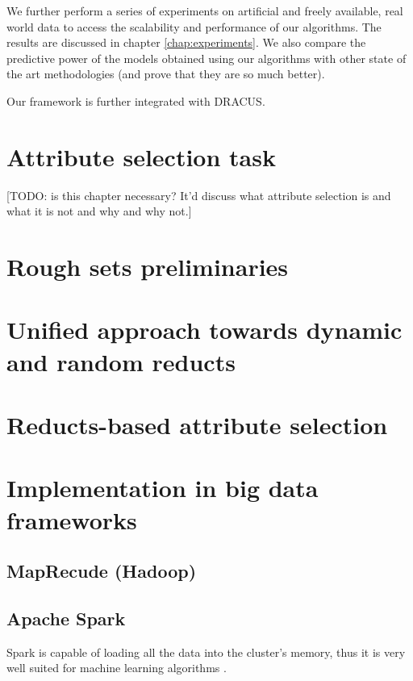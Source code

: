 \documentclass[12pt]{report}
\begin{document}
We further perform a series of experiments on artificial and freely available, real world data to access the scalability and performance of our algorithms. The results are discussed in chapter \ref{chap:experiments}. We also compare the predictive power of the models obtained using our algorithms with other state of the art methodologies (and prove that they are so much better).

Our framework is further integrated with DRACUS.

\chapter{Attribute selection task}

[TODO: is this chapter necessary? It'd discuss what attribute selection is and what it is not and why and why not.]

\chapter{Rough sets preliminaries}
\label{chap:roughsets}


\chapter{Unified approach towards dynamic and random reducts}
\label{chap:dynamicrandomreducts}


\chapter{Reducts-based attribute selection}
\label{chap:reductsattrsel}
  
  
\chapter{Implementation in big data frameworks}
\label{chap:implattlsel}

\section{MapRecude (Hadoop)}

\section{Apache Spark}

Spark is capable of loading all the data into the cluster's memory, thus it is very well suited for machine learning algorithms \cite{zaharia}.
\end{document}

